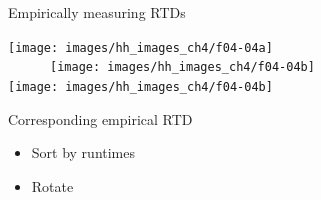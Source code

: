 \begin{frame}[c]{Empirically measuring RTDs}

\begin{multicols}{3}
\vspace*{2.5cm}
\texttt{[image: images/hh\_images\_ch4/f04-04a]}
\columnbreak
\vspace*{1.0cm}
~~~~~~\\~~~~~~\texttt{[image: images/hh\_images\_ch4/f04-04b]}
\columnbreak
~~
\\\texttt{[image: images/hh\_images\_ch4/f04-04b]}\\
\begin{center}
Corresponding empirical RTD
\end{center}
\end{multicols}

\vspace*{-0.2cm}
\begin{itemize}
  \item Sort by runtimes
  \item Rotate
\end{itemize}

\end{frame}


